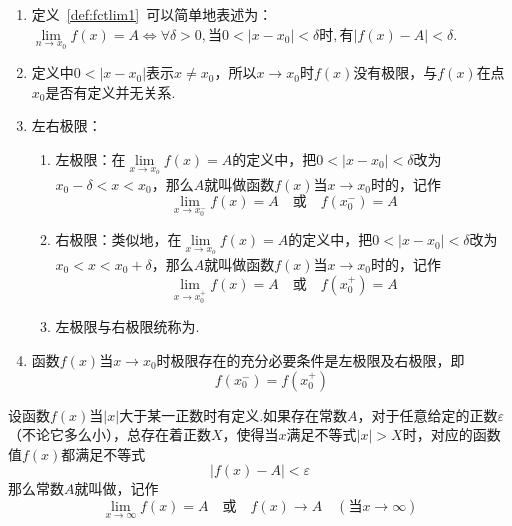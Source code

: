 \documentclass[lang=cn,10pt]{elegantbook}
\begin{document}
\begin{note}
	\begin{enumerate}
		\item 定义\ \ref{def:fctlim1}\ 可以简单地表述为：
		\( \lim\limits_{n \to x_{0}}f(x) = A \Leftrightarrow \forall \delta > 0,\text{当}0<|x - x_{0}|<\delta \text{时},\text{有}|f(x) - A| < \delta \).
		\item 定义中\( 0 < |x - x_{0}| \)表示\( x \neq x_{0} \)，所以\( x \to x_{0} \)时\( f(x) \)没有极限，与\( f(x) \)在点\( x_{0} \)是否有定义并无关系.
		\item 左右极限：
		\begin{enumerate}
			\item 左极限：在\( \lim\limits_{x \to x_{o}}f(x) = A \)的定义中，把\( 0 < |x - x_{0}| < \delta \)改为\( x_{0} - \delta < x < x_{0} \)，那么\( A \)就叫做函数\( f(x) \)当\( x \to x_{0} \)时的，记作
			\[ \lim_{x \to x_{0}^{-}}f(x) = A \quad \text{或} \quad f(x_{0}^{-}) = A \]
			\item 右极限：类似地，在\( \lim\limits_{x \to x_{o}}f(x) = A \)的定义中，把\( 0 < |x - x_{0}| < \delta \)改为\( x_{0} < x < x_{0} + \delta \)，那么\( A \)就叫做函数\( f(x) \)当\( x \to x_{0} \)时的，记作
			\[ \lim_{x \to x_{0}^{+}}f(x) = A \quad \text{或} \quad f(x_{0}^{+}) = A \]
			\item 左极限与右极限统称为.
		\end{enumerate}
		\item 函数\( f(x) \)当\( x \to x_{0} \)时极限存在的{\heiti 充分必要条件}是左极限及右极限，即
		\[ f(x_{0}^{-}) = f(x_{0}^{+}) \]
	\end{enumerate}
\end{note}

\begin{definition}[函数极限]
	\label{def:fctlim2}
	设函数\( f(x) \)当\( |x| \)大于某一正数时有定义.如果存在常数\( A \)，对于任意给定的正数\( \varepsilon \)（不论它多么小），总存在着正数\( X \)，使得当\( x \)满足不等式\( |x| > X \)时，对应的函数值\( f(x) \)都满足不等式
	\[ |f(x) - A| < \varepsilon \]
	那么常数\( A \)就叫做，记作
	\[ \lim\limits_{x \to \infty}f(x) = A \quad \text{或} \quad f(x) \to A\quad(\text{当}x \to \infty) \]
\end{definition}
\end{document}
